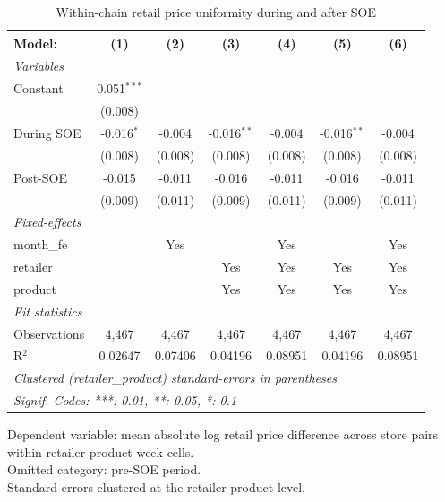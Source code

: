 
\begin{table}[htbp]
   \caption{\label{tab:uniformity_retail} Within-chain retail price uniformity during and after SOE}
   \centering
   \begin{tabular}{lcccccc}
      \tabularnewline \midrule \midrule
      Model:       & (1)           & (2)     & (3)           & (4)     & (5)           & (6)\\  
      \midrule
      \emph{Variables}\\
      Constant     & 0.051$^{***}$ &         &               &         &               &   \\   
                   & (0.008)       &         &               &         &               &   \\   
      During SOE   & -0.016$^{*}$  & -0.004  & -0.016$^{**}$ & -0.004  & -0.016$^{**}$ & -0.004\\   
                   & (0.008)       & (0.008) & (0.008)       & (0.008) & (0.008)       & (0.008)\\   
      Post-SOE     & -0.015        & -0.011  & -0.016        & -0.011  & -0.016        & -0.011\\   
                   & (0.009)       & (0.011) & (0.009)       & (0.011) & (0.009)       & (0.011)\\   
      \midrule
      \emph{Fixed-effects}\\
      month\_fe    &               & Yes     &               & Yes     &               & Yes\\  
      retailer     &               &         & Yes           & Yes     & Yes           & Yes\\  
      product      &               &         & Yes           & Yes     & Yes           & Yes\\  
      \midrule
      \emph{Fit statistics}\\
      Observations & 4,467         & 4,467   & 4,467         & 4,467   & 4,467         & 4,467\\  
      R$^2$        & 0.02647       & 0.07406 & 0.04196       & 0.08951 & 0.04196       & 0.08951\\  
      \midrule \midrule
      \multicolumn{7}{l}{\emph{Clustered (retailer\_product) standard-errors in parentheses}}\\
      \multicolumn{7}{l}{\emph{Signif. Codes: ***: 0.01, **: 0.05, *: 0.1}}\\
   \end{tabular}
   
   \par \raggedright 
   Dependent variable: mean absolute log retail price difference across store pairs within retailer-product-week cells.\\
   Omitted category: pre-SOE period.\\
   Standard errors clustered at the retailer-product level.
\end{table}


